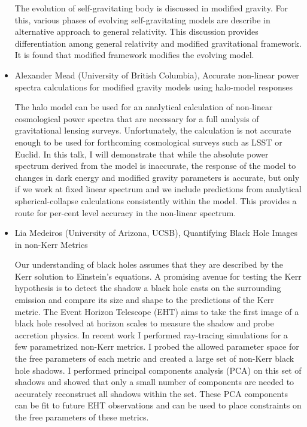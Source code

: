 \documentclass[letterpaper,12pt]{article}
\newcommand{\talk}[2]{{\fontspec{Lato Bold} #1,} {\fontspec{Lato Italic} #2}}
\begin{document}
\begin{itemize}
The evolution of self-gravitating body is discussed in modified gravity. For this, various phases of evolving self-gravitating models are describe   in alternative approach to general relativity. This discussion provides differentiation among general relativity and modified gravitational framework.  It is found that modified framework modifies the evolving model.   


\item \talk{Alexander Mead (University of British Columbia)}{Accurate non-linear power spectra calculations for modified gravity models using halo-model responses}

The halo model can be used for an analytical calculation of non-linear cosmological power spectra that are necessary for a full analysis of gravitational lensing surveys. Unfortunately, the calculation is not accurate enough to be used for forthcoming cosmological surveys such as LSST or Euclid. In this talk, I will demonstrate that while the absolute power spectrum derived from the model is inaccurate, the response of the model to changes in dark energy and modified gravity parameters is accurate, but only if we work at fixed linear spectrum and we include predictions from analytical spherical-collapse calculations consistently within the model. This provides a route for per-cent level accuracy in the non-linear spectrum.


\item \talk{Lia	Medeiros (University of Arizona, UCSB)}{Quantifying Black Hole Images in non-Kerr Metrics}

Our understanding of black holes assumes that they are described by the Kerr solution to Einstein’s equations. A promising avenue for testing the Kerr hypothesis is to detect the shadow a black hole casts on the surrounding emission and compare its size and shape to the predictions of the Kerr metric. The Event Horizon Telescope (EHT) aims to take the first image of a black hole resolved at horizon scales to measure the shadow and probe accretion physics. In recent work I performed ray-tracing simulations for a few parametrized non-Kerr metrics. I probed the allowed parameter space for the free parameters of each metric and created a large set of non-Kerr black hole shadows. I performed principal components analysis (PCA) on this set of shadows and showed that only a small number of components are needed to accurately reconstruct all shadows within the set. These PCA components can be fit to future EHT observations and can be used to place constraints on the free parameters of these metrics.



\end{itemize}
\end{document}
